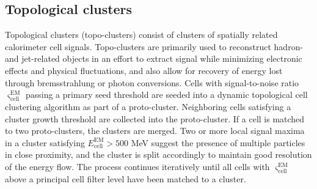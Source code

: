 \documentclass[../thesis.tex]{subfiles}
\begin{document}
\subsection{Topological clusters}
\label{sec:topocluster}

Topological clusters (topo-clusters) \citep{reco:topocluster} consist of clusters of spatially related calorimeter cell signals. Topo-clusters are primarily used to reconstruct hadron- and jet-related objects in an effort to extract signal while minimizing electronic effects and physical fluctuations, and also allow for recovery of energy lost through bremsstrahlung or photon conversions. Cells with signal-to-noise ratio $\varsigma_\mathrm{cell}^\mathrm{EM}$ passing a primary seed threshold are seeded into a dynamic topological cell clustering algorithm as part of a proto-cluster. Neighboring cells satisfying a cluster growth threshold are collected into the proto-cluster. If a cell is matched to two proto-clusters, the clusters are merged. Two or more local signal maxima in a cluster satisfying $E_\mathrm{cell}^\mathrm{EM}>500$ MeV suggest the presence of multiple particles in close proximity, and the cluster is split accordingly to maintain good resolution of the energy flow. The process continues iteratively until all cells with $\varsigma_\mathrm{cell}^\mathrm{EM}$ above a principal cell filter level have been matched to a cluster.
\end{document}
